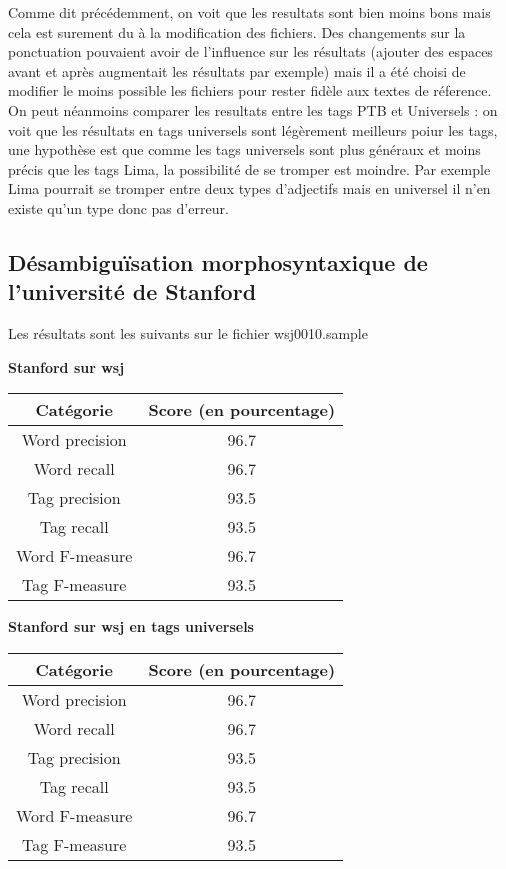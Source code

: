 \documentclass[12pt]{report}
\begin{document}
Comme dit précédemment, on voit que les resultats sont bien moins bons mais cela est surement du à la modification des fichiers. Des changements sur la ponctuation pouvaient avoir de l'influence sur les résultats (ajouter des espaces avant et après augmentait les résultats par exemple) mais il a été choisi de modifier le moins possible les fichiers pour rester fidèle aux textes de réference.\\
On peut néanmoins comparer les resultats entre les tags PTB et Universels : on voit que les résultats en tags universels sont légèrement meilleurs poiur les tags, une hypothèse est que comme les tags universels sont plus généraux et moins précis que les tags Lima, la possibilité de se tromper est moindre. Par exemple Lima pourrait se tromper entre deux types d'adjectifs mais en universel il n'en existe qu'un type donc pas d'erreur.

\subsection{Désambiguïsation morphosyntaxique de l’université de Stanford}

Les résultats sont les suivants sur le fichier wsj0010.sample

\textbf{Stanford sur wsj}

\begin{tabular}{c c}
\hline
  Catégorie & Score (en pourcentage) \\
\hline
    Word precision & 96.7 \\
    Word recall & 96.7 \\
    Tag precision & 93.5 \\
    Tag recall & 93.5 \\
    Word F-measure & 96.7 \\
    Tag F-measure & 93.5 \\
    
\end{tabular}

\vspace{15mm}
\newpage

\textbf{Stanford sur wsj en tags universels}

\begin{tabular}{c c}
\hline
  Catégorie & Score (en pourcentage) \\
\hline
    Word precision & 96.7 \\
    Word recall & 96.7 \\
    Tag precision & 93.5 \\
    Tag recall & 93.5 \\
    Word F-measure & 96.7 \\
    Tag F-measure & 93.5 \\
    
\end{tabular}
\end{document}

